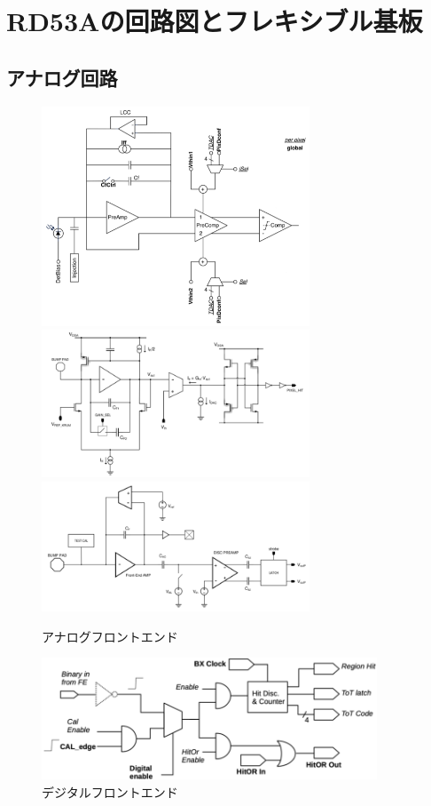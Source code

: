 \chapter{RD53Aの回路図とフレキシブル基板} \label{chap:rd53a_circit}

\section{アナログ回路}
\begin{figure}[bpt]
  \begin{center}
    \includegraphics[width=8cm]{./diff_fe.png}
    \includegraphics[width=8cm]{./lin_fe.png}
    \includegraphics[width=8cm]{./syn_fe.png}
  \caption[アナログフロントエンド]{アナログフロントエンド\cite{2-1}}
  \label{analog_fe}
  \end{center}
\end{figure}

\begin{figure}[bpt]\centering
\includegraphics[width=10cm]{./digital_fe.png}
\caption[デジタルフロントエンド]{デジタルフロントエンド\cite{2-1}}
\label{digital_fe}
\end{figure}

